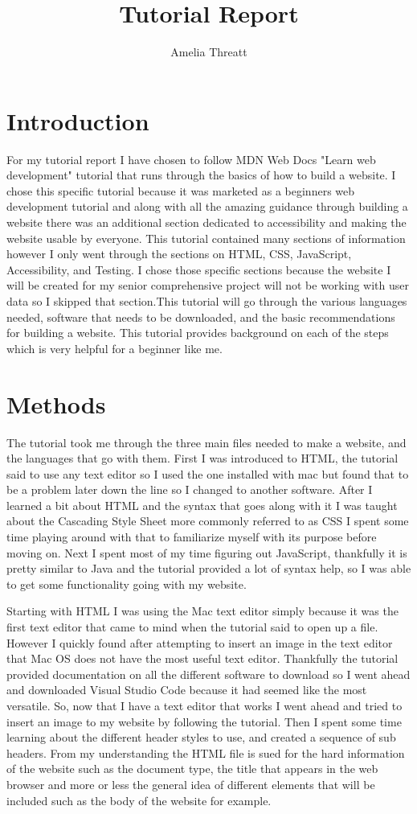 \documentclass[10pt,twocolumn]{article}
\title{Tutorial Report}
\author{Amelia Threatt}
\affiliation{Occidental College}
\begin{document}
\maketitle
\section{Introduction}
For my tutorial report I have chosen to follow MDN Web Docs "Learn web development" tutorial that runs through the basics of how to build a website. I chose this specific tutorial because it was marketed as a beginners web development tutorial and along with all the amazing guidance through building a website there was an additional section dedicated to accessibility and making the website usable by everyone. This tutorial contained many sections of information however I only went through the sections on HTML, CSS, JavaScript, Accessibility, and Testing. I chose those specific sections because the website I will be created for my senior comprehensive project will not be working with user data so I skipped that section.This tutorial will go through the various languages needed, software that needs to be downloaded, and the basic recommendations for building a website. This tutorial provides background on each of the steps which is very helpful for a beginner like me. 

\section{Methods}
The tutorial took me through the three main files needed to make a website, and the languages that go with them. First I was introduced to HTML, the tutorial said to use any text editor so I used the one installed with mac but found that to be a problem later down the line so I changed to another software. After I learned a bit about HTML and the syntax that goes along with it I was taught about the Cascading Style Sheet more commonly referred to as CSS I spent some time playing around with that to familiarize myself with its purpose before moving on. Next I spent most of my time figuring out JavaScript, thankfully it is pretty similar to Java and the tutorial provided a lot of syntax help, so I was able to get some functionality going with my website.

Starting with HTML I was using the Mac text editor simply because it was the first text editor that came to mind when the tutorial said to open up a file. However I quickly found after attempting to insert an image in the text editor that Mac OS does not have the most useful text editor. Thankfully the tutorial provided documentation on all the different software to download so I went ahead and downloaded Visual Studio Code because it had seemed like the most versatile. So, now that I have a text editor that works I went ahead and tried to insert an image to my website by following the tutorial. Then I spent some time learning about the different header styles to use, and created a sequence of sub headers. From my understanding the HTML file is sued for the hard information of the website such as the document type, the title that appears in the web browser and more or less the general idea of different elements that will be included such as the body of the website for example. 
\end{document}
